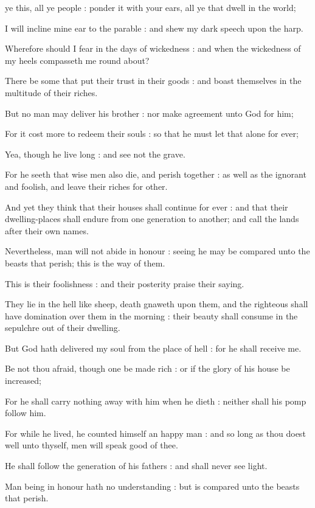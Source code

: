  ye this, all ye people : ponder it with your ears, all ye that dwell in the world;\par
{}
I will incline mine ear to the parable : and shew my dark speech upon the harp.\par
{}Wherefore should I fear in the days of wickedness : and when the wickedness of my heels compasseth me round about?\par
{}There be some that put their trust in their goods : and boast themselves in the multitude of their riches.\par
{}But no man may deliver his brother : nor make agreement unto God for him;\par
{}For it cost more to redeem their souls : so that he must let that alone for ever;\par
{}Yea, though he live long : and see not the grave.\par
{}For he seeth that wise men also die, and perish together : as well as the ignorant and foolish, and leave their riches for other.\par
{}And yet they think that their houses shall continue for ever : and that their dwelling-places shall endure from one generation to another; and call the lands after their own names.\par
{}Nevertheless, man will not abide in honour : seeing he may be compared unto the beasts that perish; this is the way of them.\par
{}This is their foolishness : and their posterity praise their saying.\par
{}They lie in the hell like sheep, death gnaweth upon them, and the righteous shall have domination over them in the morning : their beauty shall consume in the sepulchre out of their dwelling.\par
{}But God hath delivered my soul from the place of hell : for he shall receive me.\par
{}Be not thou afraid, though one be made rich : or if the glory of his house be increased;\par
{}For he shall carry nothing away with him when he dieth : neither shall his pomp follow him.\par
{}For while he lived, he counted himself an happy man : and so long as thou doest well unto thyself, men will speak good of thee.\par
{}He shall follow the generation of his fathers : and shall never see light.\par
{}Man being in honour hath no understanding : but is compared unto the beasts that perish.\par

